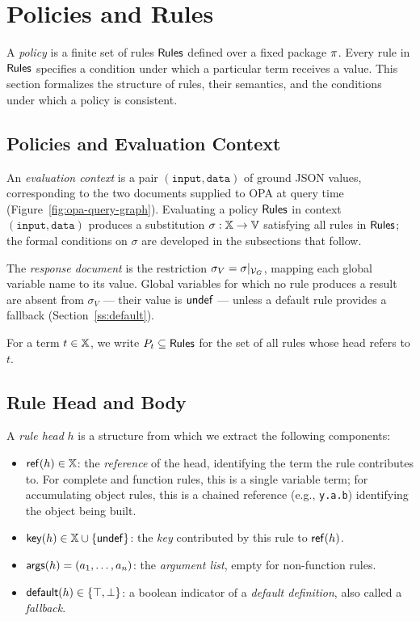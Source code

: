 \section{Policies and Rules}
\label{s:rules}

A \rego \emph{policy} is a finite set of rules $\mathsf{Rules}$ defined over a fixed package $\pi$.
Every rule in $\mathsf{Rules}$ specifies a condition under which a particular term receives a value.
This section formalizes the structure of rules, their semantics, and the conditions under which a policy is consistent.

\subsection{Policies and Evaluation Context}
\label{ss:policy}


An \emph{evaluation context} is a pair $(\mathtt{input}, \mathtt{data})$ of ground JSON values, corresponding to the two documents supplied to OPA at query time (Figure~\ref{fig:opa-query-graph}).
Evaluating a policy $\mathsf{Rules}$ in context $(\mathtt{input}, \mathtt{data})$ produces a substitution $\sigma : \mathbb{X} \to \mathbb{V}$ satisfying all rules in $\mathsf{Rules}$; the formal conditions on $\sigma$ are developed in the subsections that follow.

The \emph{response document} is the restriction $\sigma_V = \sigma|_{\mathcal{V}_G}$, mapping each global variable name to its value.
Global variables for which no rule produces a result are absent from $\sigma_V$ — their value is $\mathsf{undef}$ — unless a default rule provides a fallback (Section~\ref{ss:default}).

For a term $t \in \mathbb{X}$, we write $P_t \subseteq \mathsf{Rules}$ for the set of all rules whose head refers to $t$.


\subsection{Rule Head and Body}
\label{ss:head-body}


A \emph{rule head} $h$ is a structure from which we extract the following components:
\begin{itemize}
  \item $\mathsf{ref}(h) \in \mathbb{X}$: the \emph{reference} of the head, identifying the term the rule contributes to.
    For complete and function rules, this is a single variable term; for accumulating object rules, this is a chained reference (e.g., \texttt{y.a.b}) identifying the object being built.
  \item $\mathsf{key}(h) \in \mathbb{X} \cup \{\mathsf{undef}\}$: the \emph{key} contributed by this rule to $\mathsf{ref}(h)$.
  \item $\mathsf{args}(h) = (a_1, \ldots, a_n)$: the \emph{argument list}, empty for non-function rules.
  \item $\mathsf{default}(h) \in \{\top,\bot\}$: a boolean indicator of a \emph{default definition}, also called a \emph{fallback}.
\end{itemize}


